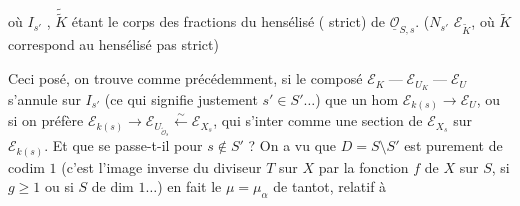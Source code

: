où $I_{s'}$  , $\widetilde{\widetilde K}$ étant le corps
des fractions du hensélisé ( strict)
de $\underline{\mathcal O}_{S,s}$. ($N_{s'}$  
$\mathcal E_{\widetilde K}$, où $\widetilde K$ correspond au hensélisé pas strict)

Ceci posé, on trouve comme précédemment,
si le composé  $\mathcal E_K\mathrel{\text{---}}\mathcal E_{U_K}\mathrel{\text{---}}\mathcal E_U$
s'annule sur $I_{s'}$   (ce qui signifie
justement  $s'\in S'\ldots$) que un hom
$\mathcal E_{k(s)}\longrightarrow\mathcal E_U$, ou si on préfère
$\mathcal E_{k(s)}\longrightarrow\mathcal E_{U_{\widetilde{\mathcal O}_s}}\xleftarrow{\sim}\mathcal E_{X_s}$, qui   s'inter%
 comme une section de $\mathcal E_{X_s}$ sur
$\mathcal E_{k(s)}$. Et que se passe-t-il pour
$s\notin S'$ ?  On a vu que
$D=S\setminus S'$ est purement de codim $1$
(c'est l'image inverse du diviseur
$T$ sur $X$ par la fonction $f$ de $X$ sur $S$,
 si $g\geq1$ ou si $S$ de dim $1\ldots$)
en fait le $\mu=\mu_\alpha$ de tantot, relatif à
